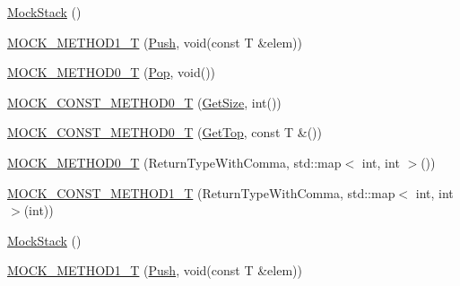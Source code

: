 \begin{DoxyCompactItemize}
\mbox{\hyperlink{classtesting_1_1gmock__generated__function__mockers__test_1_1_mock_stack_aa8a3df8e1cbc95836663acd99c3e9d37}{Mock\+Stack}} ()
\item 
\mbox{\hyperlink{classtesting_1_1gmock__generated__function__mockers__test_1_1_mock_stack_a0ad833bc6134c5150b8271a5ba2e91b5}{M\+O\+C\+K\+\_\+\+M\+E\+T\+H\+O\+D1\+\_\+T}} (\mbox{\hyperlink{classtesting_1_1gmock__generated__function__mockers__test_1_1_stack_interface_a49448f6195021fee947d37b80b6e5d30}{Push}}, void(const T \&elem))
\item 
\mbox{\hyperlink{classtesting_1_1gmock__generated__function__mockers__test_1_1_mock_stack_a5e55ffb22e7f11c6940a97bd001bd50c}{M\+O\+C\+K\+\_\+\+M\+E\+T\+H\+O\+D0\+\_\+T}} (\mbox{\hyperlink{classtesting_1_1gmock__generated__function__mockers__test_1_1_stack_interface_a1a6646d1d9febe90c607b9b3e4539b67}{Pop}}, void())
\item 
\mbox{\hyperlink{classtesting_1_1gmock__generated__function__mockers__test_1_1_mock_stack_a6171be20e8e4f44464cc8968e05b7c7a}{M\+O\+C\+K\+\_\+\+C\+O\+N\+S\+T\+\_\+\+M\+E\+T\+H\+O\+D0\+\_\+T}} (\mbox{\hyperlink{classtesting_1_1gmock__generated__function__mockers__test_1_1_stack_interface_a537ec8647a2333f50e5f923a85b90eba}{Get\+Size}}, int())
\item 
\mbox{\hyperlink{classtesting_1_1gmock__generated__function__mockers__test_1_1_mock_stack_ae5950cfac08382a0ffc7c3bd5aba405f}{M\+O\+C\+K\+\_\+\+C\+O\+N\+S\+T\+\_\+\+M\+E\+T\+H\+O\+D0\+\_\+T}} (\mbox{\hyperlink{classtesting_1_1gmock__generated__function__mockers__test_1_1_stack_interface_af36e32b9ae568100363466d1ebf95364}{Get\+Top}}, const T \&())
\item 
\mbox{\hyperlink{classtesting_1_1gmock__generated__function__mockers__test_1_1_mock_stack_a4b67d1f5b795e7c072fb846217a8f130}{M\+O\+C\+K\+\_\+\+M\+E\+T\+H\+O\+D0\+\_\+T}} (Return\+Type\+With\+Comma, std\+::map$<$ int, int $>$())
\item 
\mbox{\hyperlink{classtesting_1_1gmock__generated__function__mockers__test_1_1_mock_stack_a69b9a7d0231b729d8a47201a49fa9166}{M\+O\+C\+K\+\_\+\+C\+O\+N\+S\+T\+\_\+\+M\+E\+T\+H\+O\+D1\+\_\+T}} (Return\+Type\+With\+Comma, std\+::map$<$ int, int $>$(int))
\item 
\mbox{\hyperlink{classtesting_1_1gmock__generated__function__mockers__test_1_1_mock_stack_aa8a3df8e1cbc95836663acd99c3e9d37}{Mock\+Stack}} ()
\item 
\mbox{\hyperlink{classtesting_1_1gmock__generated__function__mockers__test_1_1_mock_stack_a0ad833bc6134c5150b8271a5ba2e91b5}{M\+O\+C\+K\+\_\+\+M\+E\+T\+H\+O\+D1\+\_\+T}} (\mbox{\hyperlink{classtesting_1_1gmock__generated__function__mockers__test_1_1_stack_interface_a49448f6195021fee947d37b80b6e5d30}{Push}}, void(const T \&elem))

\end{DoxyCompactItemize}

